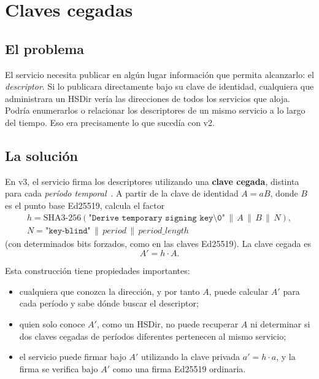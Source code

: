 \section{Claves cegadas}\label{sec:os-accecate}

\subsection{El problema}

El servicio necesita publicar en algún lugar información que permita alcanzarlo: el \emph{descriptor}. Si lo publicara directamente bajo su clave de identidad, cualquiera que administrara un HSDir vería las direcciones de todos los servicios que aloja. Podría enumerarlos o relacionar los descriptores de un mismo servicio a lo largo del tiempo. Eso era precisamente lo que sucedía con v2.

\subsection{La solución}

En v3, el servicio firma los descriptores utilizando una \textbf{clave cegada}, distinta para cada \emph{período temporal}~. A partir de la clave de identidad $A=aB$, donde $B$ es el punto base Ed25519, calcula el factor
\begin{gather*}
h = \mathrm{SHA3\text{-}256}(\texttt{"Derive temporary signing key\textbackslash 0"} \,\|\, A \,\|\, B \,\|\, N), \\
N = \texttt{"key-blind"} \,\|\, \mathit{period} \,\|\, \mathit{period\_length}
\end{gather*}
(con determinados bits forzados, como en las claves Ed25519). La clave cegada es
\[
A' = h \cdot A.
\]

Esta construcción tiene propiedades importantes:
\begin{itemize}
  \item cualquiera que conozca la dirección, y por tanto $A$, puede calcular $A'$ para cada período y sabe dónde buscar el descriptor;
  \item quien solo conoce $A'$, como un HSDir, no puede recuperar $A$ ni determinar si dos claves cegadas de períodos diferentes pertenecen al mismo servicio;
  \item el servicio puede firmar bajo $A'$ utilizando la clave privada $a'=h\cdot a$, y la firma se verifica bajo $A'$ como una firma Ed25519 ordinaria.
\end{itemize}

